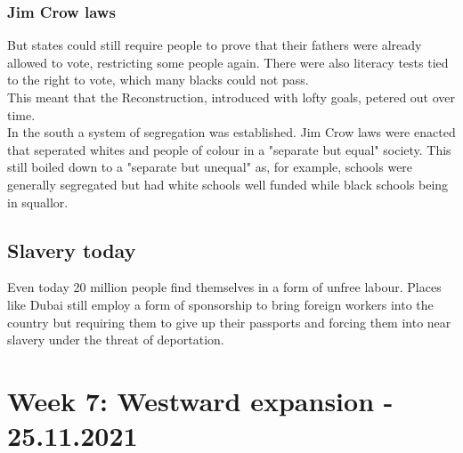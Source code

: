 \documentclass{article}
\begin{document}
	\subsubsection{Jim Crow laws}
	But states could still require people to prove that their fathers were already allowed to vote, restricting some people again. There were also literacy tests tied to the right to vote, which many blacks could not pass. \\
	This meant that the Reconstruction, introduced with lofty goals, petered out over time. \\
	In the south a system of segregation was established. Jim Crow laws were enacted that seperated whites and people of colour in a "separate but equal" society. This still boiled down to a "separate but unequal" as, for example, schools were generally segregated but had white schools well funded while black schools being in squallor. \\
	\subsection{Slavery today}
	Even today 20 million people find themselves in a form of unfree labour. Places like Dubai still employ a form of sponsorship to bring foreign workers into the country but requiring them to give up their passports and forcing them into near slavery under the threat of deportation. \\
	\newpage
	\section{Week 7: Westward expansion - 25.11.2021}
\end{document}

